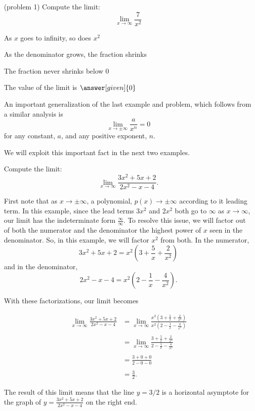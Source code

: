\documentclass{ximera}
\begin{document}
\begin{problem}(problem 1)
  Compute the limit:
  \[
  \lim_{x \to \infty} \frac{7}{x^2}
  \]
  
    \begin{hint}
      As $x$ goes to infinity, so does $x^2$
    \end{hint}
    \begin{hint}
      As the denominator grows, the fraction shrinks
    \end{hint}
    \begin{hint}
      The fraction never shrinks below 0
    \end{hint}
		The value of the limit is
		 $\answer[given]{0}$
		
\end{problem}

An important generalization of the last example and problem, which follows from a similar analysis is 
\[\lim_{x \to \pm \infty} \frac{a}{x^n} = 0 \]
for any constant, $a$, and any positive exponent, $n$.

We will exploit this important fact in the next two examples.


\begin{example}[example 2]
Compute the limit:
\[
\lim_{x \to \infty} \frac{3x^2 + 5x + 2}{2x^2 -x- 4}.
\]

First note that as $x\to \pm \infty$, a polynomial, $p(x) \to \pm \infty$ according to it leading term.
In this example, since the lead terms $3x^2$ and $2x^2$ both go to $\infty$ as $x \to \infty$, 
our limit has the indeterminate form
$\frac{\infty}{\infty}$.
To resolve this issue, we will factor out of both the numerator and the denominator 
the highest power of $x$ seen in the denominator.  So, in this example, we will factor $x^2$ from both.
In the numerator, 
\[3x^2 + 5x + 2 = x^2(3 + \frac{5}{x} + \frac{2}{x^2})\]
and in the denominator,
\[2x^2 -x -4 = x^2(2- \frac{1}{x} - \frac{4}{x^2}).\]

With these factorizations, our limit becomes

\begin{align*}
\lim_{x \to \infty} \frac{3x^2 + 5x + 2}{2x^2 -x- 4} &= 
\lim_{x \to \infty} \frac{x^2(3 + \frac{5}{x} + \frac{2}{x^2})}{x^2(2- \frac{1}{x} - \frac{4}{x^2})} \\ \\
&=\lim_{x \to \infty} \frac{3 + \frac{5}{x} + \frac{2}{x^2}}{2- \frac{1}{x} - \frac{4}{x^2}} \\ \\
&=\frac{3 + 0 + 0}{2- 0 - 0} \\ \\
&= \frac32.
\end{align*}

The result of this limit means that the line $y = 3/2$ is a horizontal asymptote
for the graph of $y = \frac{3x^2 + 5x + 2}{2x^2 -x- 4}$ on the right end.
\end{example}
\end{document}
